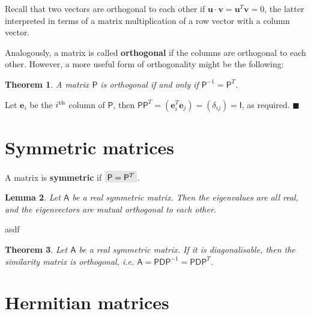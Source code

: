 \documentclass[letter-paper]{tufte-book}
\newtheorem{theorem}{\color{pastel-blue}Theorem}[section]
\newtheorem{lemma}[theorem]{\color{pastel-blue}Lemma}
\newenvironment{proof}[1][Proof]{\begin{trivlist}
\item[\hskip \labelsep {\bfseries #1}]}{\end{trivlist}}
\newcommand{\qed}{\hfill$\blacksquare$}
\newcommand{\highlight}[1]{\mathchoice%
  {\colorbox{black!10}{$\displaystyle#1$}}%
  {\colorbox{black!10}{$\textstyle#1$}}%
  {\colorbox{black!10}{$\scriptstyle#1$}}%
  {\colorbox{black!10}{$\scriptscriptstyle#1$}}}%
\begin{document}
Recall that two vectors are orthogonal to each other if
$\boldsymbol{u}\cdot\boldsymbol{v} = \boldsymbol{u}^T\boldsymbol{v} = 0$, the
latter interpreted in terms of a matrix multiplication of a row vector with a
column vector. 

Analogously, a matrix is called \textbf{orthogonal} if the columns are
orthogonal to each other. However, a more useful form of orthogonality might be
the following:
\begin{theorem}
  A matrix $\mathsf{P}$ is orthogonal if and only if $\mathsf{P}^{-1} =
  \mathsf{P}^T$.
\end{theorem}

\begin{proof}
  Let $\boldsymbol{e}_i$ be the $i^{\textnormal{th}}$ column of $\mathsf{P}$,
  then $\mathsf{PP}^T = (\boldsymbol{e}_i^T \boldsymbol{e}_j) = (\delta_{ij}) =
  \mathsf{I}$, as required. \qed
\end{proof}


\section{Symmetric matrices}

A matrix is \textbf{symmetric} if $\highlight{\mathsf{P} = \mathsf{P}^T}$.

\begin{lemma}
  Let $\mathsf{A}$ be a real symmetric matrix. Then the eigenvalues are all
  real, and the eigenvectors are mutual orthogonal to each other.
\end{lemma}

\begin{proof}
asdf
\end{proof}

\begin{theorem}
  Let $\mathsf{A}$ be a real symmetric matrix. If it is diagonalisable, then the
  similarity matrix is orthogonal, i.e. $\mathsf{A} = \mathsf{PD}\mathsf{P}^{-1}
  = \mathsf{PD}\mathsf{P}^T$.
\end{theorem}


\section{Hermitian matrices}
\end{document}
